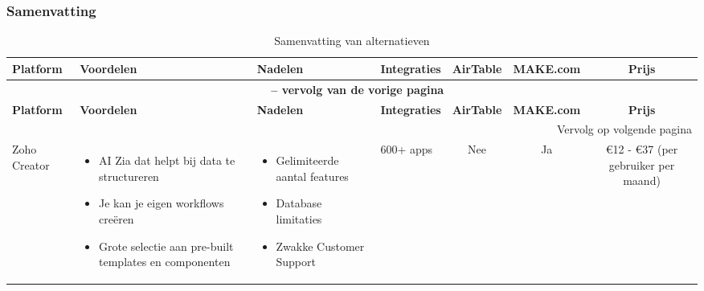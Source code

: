 \subsubsection*{Samenvatting}
\begin{longtable}{p{2.2cm} p{2.4cm} p{2.4cm} p{2.2cm} c c c}
    \caption{Samenvatting van alternatieven} \label{samenvatting-alternatieven} \\
    \toprule
    \textbf{Platform} & \textbf{Voordelen} & \textbf{Nadelen} & \textbf{Integraties} & \textbf{AirTable} & \textbf{MAKE.com} & \textbf{Prijs} \\
    \midrule
    \endfirsthead

    \multicolumn{7}{c}{{\bfseries \tablename\ \thetable{} -- vervolg van de vorige pagina}} \\
    \toprule
    \textbf{Platform} & \textbf{Voordelen} & \textbf{Nadelen} & \textbf{Integraties} & \textbf{AirTable} & \textbf{MAKE.com} & \textbf{Prijs} \\
    \midrule
    \endhead

    \midrule
    \multicolumn{7}{r}{{Vervolg op volgende pagina}} \\
    \endfoot

    \bottomrule
    \endlastfoot

    Zoho Creator & 
    \begin{itemize}
        \item AI Zia dat helpt bij data te structureren
        \item Je kan je eigen workflows creëren
        \item Grote selectie aan pre-built templates en componenten
    \end{itemize} & 
    \begin{itemize}
        \item Gelimiteerde aantal features
        \item Database limitaties
        \item Zwakke Customer Support
    \end{itemize} &
    600+ apps &
    Nee &
    Ja &
    €12 - €37 (per gebruiker per maand)\\


\end{longtable}
